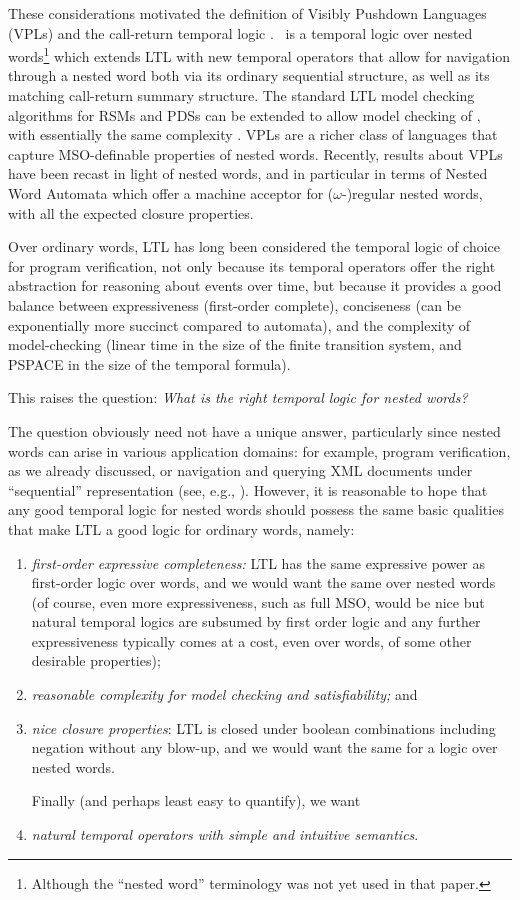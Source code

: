 \documentclass{LMCS}
\theoremstyle{plain}
\theoremstyle{definition}
\newcommand{\caret}{\text{CaRet}}
\newcounter{example}
\begin{document}
These considerations motivated the definition 
of Visibly Pushdown Languages (VPLs) \cite{VPL} and
the call-return temporal logic \caret{} \cite{AEM04}.
\caret\ is a temporal logic over nested words\footnote{Although
the ``nested word'' terminology was not yet used in that paper.}
which extends LTL with new temporal operators that allow for
navigation through a nested word both via its ordinary sequential
structure, as well as its matching 
call-return summary structure.
The standard LTL model checking
algorithms for RSMs and PDSs can be extended to allow model
checking of \caret{}, with essentially the same complexity \cite{AEM04}.
VPLs \cite{VPL} are a richer class of languages
that capture MSO-definable properties of nested
words.  
Recently, results about VPLs have been recast in light
of nested words, and in particular in terms of Nested Word Automata
\cite{nested} which offer a machine acceptor 
for ($\omega$-)regular nested words, with all the
expected closure properties.

Over ordinary words, LTL has long been considered
the temporal logic of choice 
for program verification, not only
because its temporal operators offer the right abstraction for reasoning
about events over time, but
because it provides a good balance
between expressiveness (first-order complete), 
conciseness (can be exponentially more succinct compared to automata), 
and the complexity of  
model-checking (linear time
in the size of the finite transition system, 
and PSPACE in the size of the temporal formula).

This raises the question: 
{\em What is the right temporal logic 
for nested words?
}

The question obviously need not have a unique answer, particularly
since nested words can arise in various application domains: for
example, 
program verification, as we already discussed, or navigation and querying XML
documents under ``sequential'' representation (see, e.g., \cite{SV02}).
However, it is reasonable to hope that any good temporal logic for
nested words should possess the same basic qualities that make LTL a
good logic for ordinary words, namely: 
\begin{enumerate}[(1)]
\item  {\em first-order
expressive completeness:} LTL has the same expressive power as
first-order logic over words, and we would want the same over nested
words (of course, even more expressiveness, such as full MSO, would
be nice but natural temporal logics are subsumed by first order logic
and any further expressiveness typically comes at a cost, even over
words, of some other desirable properties); 
\item {\em reasonable
complexity for model checking and satisfiability;} and 
\item {\em nice
closure properties}: LTL is closed under boolean combinations
including negation without any blow-up, and we would want the same
for a logic over nested words. 

Finally (and perhaps least easy to
quantify), we want 
\item  {\em natural temporal operators with simple and
intuitive semantics}.  
\end{enumerate}
\end{document}
